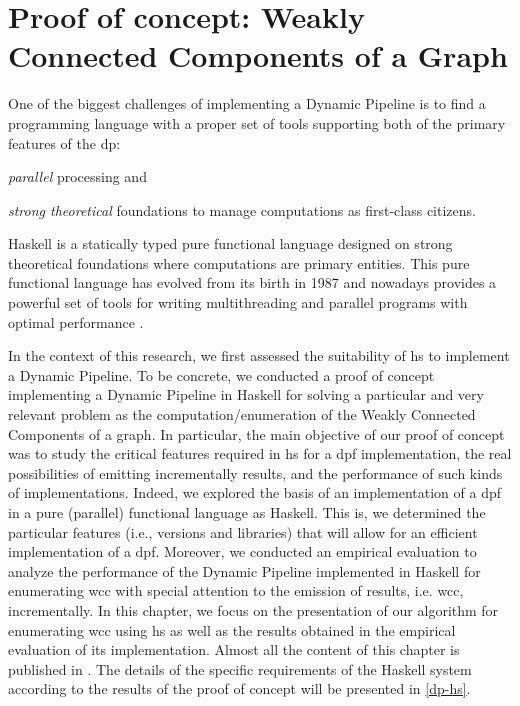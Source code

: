 \chapter{Proof of concept: Weakly Connected Components of a Graph}\label{prole}

One of the biggest challenges of implementing a Dynamic Pipeline is to find  a programming language with a proper set of tools supporting both of the  primary features of the \acrshort{dp}: \begin{inparaenum}[i\upshape)]
\item  \emph{parallel} processing and 
\item  \emph{strong theoretical} foundations to manage computations as first-class citizens.
 \end{inparaenum}
Haskell is a statically typed pure functional language designed on strong theoretical foundations where computations are primary entities.
This pure functional language has evolved from its birth in 1987 and nowadays provides a powerful set of tools for writing multithreading and parallel programs with optimal performance \cite{parallelbook, monadpar}. 

In the context of this research, we first assessed the suitability of \acrlong{hs}  to implement a Dynamic Pipeline. 
To be concrete, we conducted a proof of concept implementing a Dynamic Pipeline in  Haskell for solving a particular and very relevant problem as the computation/enumeration of the Weakly Connected Components of a graph.
In particular, the main objective of our proof of concept was to study the critical features required in \acrshort{hs} for a \acrshort{dpf} implementation,  the real possibilities of emitting incrementally results, and the performance of such kinds of implementations. 
Indeed, we explored the basis of an implementation of a \acrshort{dpf}  in a pure (parallel) functional language as Haskell.
This is, we determined the particular features (i.e., versions and libraries) that will allow for an efficient implementation of a \acrshort{dpf}. 
Moreover, we conducted an empirical evaluation to analyze the performance of the Dynamic Pipeline implemented in Haskell for enumerating \acrshort{wcc} with special attention to the emission of results, i.e. \acrshort{wcc}, incrementally. 
In this chapter, we focus on the presentation of our algorithm for enumerating \acrshort{wcc} using \acrshort{hs} as well as the results obtained in the empirical evaluation of its implementation. Almost all the content of this chapter is published in \cite{prole21}. 
The details of the specific requirements of the Haskell system according to the results of the proof of concept will be presented in \autoref{dp-hs}.
 
